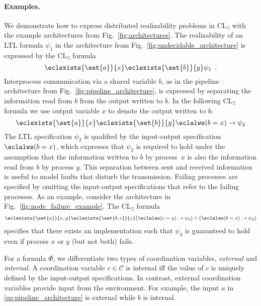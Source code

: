 \documentclass{LMCS}
\theoremstyle{plain}\newtheorem{theorem}[thm]{Theorem}
\theoremstyle{plain}\newtheorem{lemma}[thm]{Lemma}
\theoremstyle{plain}\newtheorem{proposition}[thm]{Proposition}
\theoremstyle{plain}\newtheorem{corollary}[thm]{Corollary}
\theoremstyle{definition}\newtheorem{definition}{Definition}[section]
\begin{document}
\paragraph{\bf Examples.}
We demonstrate how to express distributed realizability problems in CL$_\exists$ with the example architectures from Fig.~\ref{fig:architectures}.
The realizability of an LTL formula $\psi_1$ in the architecture from Fig.~\ref{fig:undecidable_architecture} is expressed by the CL$_\exists$ formula 
\begin{equation} \label{eq:undecidable_architecture}
\eclexists{\set{a}}{x} \eclexists{\set{b}}{y} \psi_1 \enspace .
\end{equation}
Interprocess communication via a shared variable $b$, as in the pipeline architecture from Fig.~\ref{fig:pipeline_architecture}, is expressed by separating the information read from $b$ from the output written to $b$.
In the following CL$_\exists$ formula we use output variable $x$ to denote the output written to $b$:
\begin{equation} \label{eq:pipeline_architecture}
\eclexists{\set{a}}{x} \eclexists{\set{b}}{y} \eclalws (b = x) \rightarrow \psi_2
\end{equation}
The LTL specification $\psi_2$ is qualified by the input-output specification $\eclalws (b = x)$, which expresses that $\psi_2$ is required to hold under the assumption that the information written to $b$ by process~$x$ is also the information read from $b$ by process $y$. This separation between sent and received information is useful to model faults that disturb the transmission. Failing processes are specified by omitting the input-output specifications that refer to the failing processes. As an example, consider the architecture in Fig.~\ref{fig:node_failure_example}. The CL$_\exists$ formula
\begin{equation} \label{eq:node_failure_example}
  \eclexists{\set{a}}{x,y} \eclexists{\set{b,c}}{z} \big(\eclalws (c = y) \rightarrow \psi_3 \big) \land \big(\eclalws (b = x) \rightarrow \psi_3 \big)
\end{equation}
specifies that there exists an implementation such that $\psi_3$ is guaranteed to hold even if process $x$ or $y$ (but not both) fails.

For a formula $\Phi$, we differentiate two types of coordination variables, \emph{external} and \emph{internal}.
A coordination variable $c \in \mathcal{C}$ is internal iff the value of $c$ is uniquely defined by the input-output specifications.
In contrast, external coordination variables provide input from the environment.
For example, the input $a$ in \eqref{eq:pipeline_architecture} is external while $b$ is internal.
\end{document}
